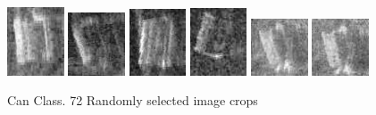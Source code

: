 \begin{figure}
    \includegraphics[width=0.15\textwidth]{chapters/images/dataset/all-class-images/can/can-112.jpg}
    \includegraphics[width=0.15\textwidth]{chapters/images/dataset/all-class-images/can/can-306.jpg}
    \includegraphics[width=0.15\textwidth]{chapters/images/dataset/all-class-images/can/can-174.jpg}
    \includegraphics[width=0.15\textwidth]{chapters/images/dataset/all-class-images/can/can-320.jpg}
    \includegraphics[width=0.15\textwidth]{chapters/images/dataset/all-class-images/can/can-276.jpg}
    \includegraphics[width=0.15\textwidth]{chapters/images/dataset/all-class-images/can/can-250.jpg}
    
    \caption{Can Class. 72 Randomly selected image crops}
    \label{appendix:can}
\end{figure}

